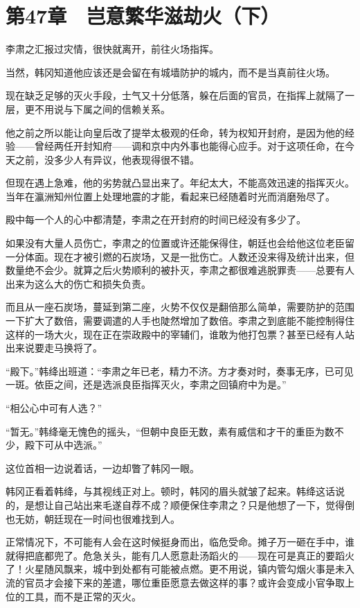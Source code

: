 \section{第47章　岂意繁华滋劫火（下）}

李肃之汇报过灾情，很快就离开，前往火场指挥。

当然，韩冈知道他应该还是会留在有城墙防护的城内，而不是当真前往火场。

现在缺乏足够的灭火手段，士气又十分低落，躲在后面的官员，在指挥上就隔了一层，更不用说与下属之间的信赖关系。

他之前之所以能让向皇后改了提举太极观的任命，转为权知开封府，是因为他的经验——曾经两任开封知府——调和京中内外事也能得心应手。对于这项任命，在今天之前，没多少人有异议，他表现得很不错。

但现在遇上急难，他的劣势就凸显出来了。年纪太大，不能高效迅速的指挥灭火。当年在瀛洲知州位置上处理地震的才能，看起来已经随着时光而消磨殆尽了。

殿中每一个人的心中都清楚，李肃之在开封府的时间已经没有多少了。

如果没有大量人员伤亡，李肃之的位置或许还能保得住，朝廷也会给他这位老臣留一分体面。现在才被引燃的石炭场，又是一批伤亡。人数还没来得及统计出来，但数量绝不会少。就算之后火势顺利的被扑灭，李肃之都很难逃脱罪责——总要有人出来为这么大的伤亡和损失负责。

而且从一座石炭场，蔓延到第二座，火势不仅仅是翻倍那么简单，需要防护的范围一下扩大了数倍，需要调遣的人手也陡然增加了数倍。李肃之到底能不能控制得住这样的一场大火，现在正在崇政殿中的宰辅们，谁敢为他打包票？甚至已经有人站出来说要走马换将了。

“殿下。”韩绛出班道：“李肃之年已老，精力不济。方才奏对时，奏事无序，已可见一斑。依臣之间，还是选派良臣指挥灭火，李肃之回镇府中为是。”

“相公心中可有人选？”

“暂无。”韩绛毫无愧色的摇头，“但朝中良臣无数，素有威信和才干的重臣为数不少，殿下可从中选派。”

这位首相一边说着话，一边却瞥了韩冈一眼。

韩冈正看着韩绛，与其视线正对上。顿时，韩冈的眉头就皱了起来。韩绛这话说的，是想让自己站出来毛遂自荐不成？顺便保住李肃之？只是他想了一下，觉得倒也无妨，朝廷现在一时间也很难找到人。

正常情况下，不可能有人会在这时候挺身而出，临危受命。摊子万一砸在手中，谁就得把底都兜了。危急关头，能有几人愿意赴汤蹈火的——现在可是真正的要蹈火了！火星随风飘来，城中到处都有可能被点燃。更不用说，镇内管勾烟火事是未入流的官员才会接下来的差遣，哪位重臣愿意去做这样的事？或许会变成小官争取上位的工具，而不是正常的灭火。

